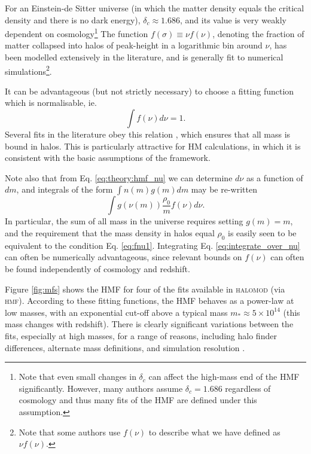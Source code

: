 \documentclass[5p,aas_macros]{elsarticle}
\begin{document}
For an Einstein-de Sitter universe (in which the matter density equals the critical density and there is no dark energy), $\delta_c \approx 1.686$, and its value is very weakly dependent on cosmology\footnote{Note that even small changes in $\delta_c$ can affect the high-mass end of the HMF significantly. However, many authors assume $\delta_c = 1.686$ regardless of cosmology and thus many fits of the HMF are defined under this assumption.}
The function $f(\sigma) \equiv \nu f(\nu)$, denoting the fraction of matter collapsed into halos of peak-height in a logarithmic bin around $\nu$, has been modelled extensively in the literature, and is generally fit to numerical simulations\footnote{Note that some authors use $f(\nu)$ to describe what we have defined as $\nu f(\nu)$.}. 

It can be advantageous (but not strictly necessary) to choose a fitting function which is normalisable, ie.
\begin{equation}
    \label{eq:fnu1}
    \int f(\nu) d\nu = 1.
\end{equation}
Several fits in the literature obey this relation \citep[eg.][]{Sheth2001,Peacock2007,Tinker2010},  which ensures that all mass is bound in halos. This is particularly attractive for HM calculations, in which it is consistent with the basic assumptions of the framework.

Note also that from Eq. \ref{eq:theory:hmf_nu} we can determine $d\nu$ as a function of $dm$, and integrals of the form $\int n(m) g(m) dm$ may be re-written
\begin{equation}
    \label{eq:integrate_over_nu}
    \int g(\nu(m)) \frac{\rho_0}{m} f(\nu) d\nu.
\end{equation}
In particular, the sum of all mass in the universe requires setting $g(m) = m$, and the requirement that the mass density in halos equal $\rho_0$ is easily seen to be equivalent to the condition Eq. \ref{eq:fnu1}. 
Integrating Eq. \ref{eq:integrate_over_nu} can often be numerically advantageous, since relevant bounds on $f(\nu)$ can often be found independently of cosmology and redshift.

Figure \ref{fig:mfs} shows the HMF for four of the fits available in \textsc{halomod} (via \textsc{hmf}). According to these fitting functions, the HMF behaves as a power-law at low masses, with an exponential cut-off above a typical mass $m_* \approx 5\times10^{14}$ (this mass changes with redshift). There is clearly significant variations between the fits, especially at high masses, for a range of reasons, including halo finder differences, alternate mass definitions, and simulation resolution \citep[cf.][]{Murray2013a,Knebe2011}. 
\end{document}

